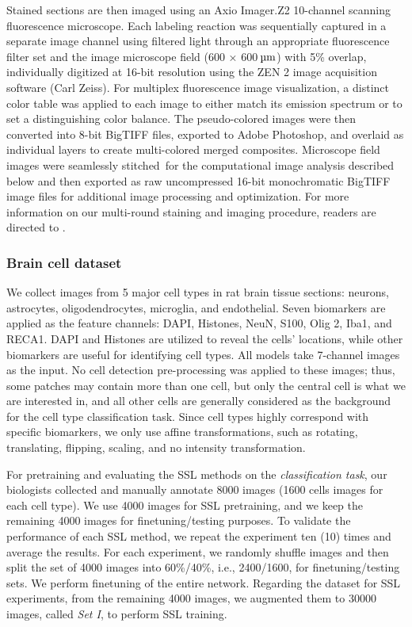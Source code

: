 \documentclass[10pt,twocolumn,letterpaper]{article}
\begin{document}
Stained sections are then imaged using an Axio Imager.Z2 10-channel scanning fluorescence microscope. Each labeling reaction was sequentially captured in a separate image channel using filtered light through an appropriate fluorescence filter set and the image microscope field (600 × 600\(\:\mathrm{\text\textmu m}\)) with 5\% overlap, individually digitized at 16-bit resolution using the ZEN 2 image acquisition software (Carl Zeiss). For multiplex fluorescence image visualization, a distinct color table was applied to each image to either match its emission spectrum or to set a distinguishing color balance. The pseudo-colored images were then converted into 8-bit BigTIFF files, exported to Adobe Photoshop, and overlaid as individual layers to create multi-colored merged composites. Microscope field images were seamlessly stitched for the computational image analysis described below and then exported as raw uncompressed 16-bit monochromatic BigTIFF image files for additional image processing and optimization. For more information on our multi-round staining and imaging procedure, readers are directed to \cite{maric2021whole}.







\subsubsection{Brain cell dataset} We collect images from 5 major cell types in rat brain tissue sections: neurons, astrocytes, oligodendrocytes, microglia, and endothelial. Seven biomarkers are applied as the feature channels: DAPI, Histones, NeuN, S100, Olig 2, Iba1, and RECA1. DAPI and Histones are utilized to reveal the cells' locations, while other biomarkers are useful for identifying cell types. All models take 7-channel images as the input. 
No cell detection pre-processing was applied to these images; thus, some patches may contain more than one cell, but only the central cell is what we are interested in, and all other cells are generally considered as the background for the cell type classification task. 
Since cell types highly correspond with specific biomarkers, we only use affine transformations, such as rotating, translating, flipping, scaling, and no intensity transformation.

For pretraining and evaluating the SSL methods on the {\textit{classification task}}, our biologists collected and manually annotate 8000 images (1600 cells images for each cell type). We use 4000 images for SSL pretraining, and we keep the remaining 4000 images for finetuning/testing purposes. To validate the performance of each SSL method, we repeat the experiment ten (10) times and average the results. For each experiment, we randomly shuffle images and then split the set of 4000 images into 60\%/40\%, i.e., 2400/1600, for finetuning/testing sets. We perform finetuning of the entire network. Regarding the dataset for SSL experiments, from the remaining 4000 images, we augmented them to 30000 images, called \textit{Set I}, to perform SSL training. 
\end{document}
